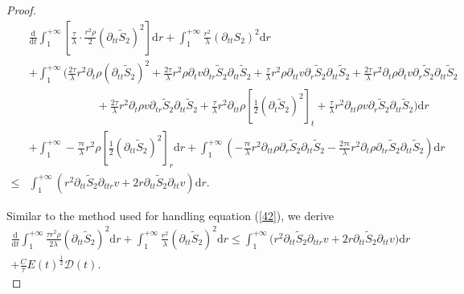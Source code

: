 \documentclass[10pt,reqno]{amsart}
\numberwithin{equation}{section}
\begin{document}
\begin{proof}
			\begin{align}\label{43}
				&\frac{\mathrm{d}}{\mathrm{d} t}\int_{1}^{+\infty}\left[\frac{\tau }{\lambda} \cdot \frac{r^2 \rho}{2}(\partial_{tt} \tilde{S}_2)^2\right]\mathrm{d}r
				+\int_{1}^{+\infty}\frac{r^2}{\lambda}(\partial_{tt}{S_2})^2\mathrm{d}r \nonumber \\
				&+\int_{1}^{+\infty}\bigg(\frac{2\tau }{\lambda}r^2\partial_{t}\rho(\partial_{tt} \tilde{S}_2)^2
				+\frac{2\tau }{\lambda}r^2\rho\partial_{t}v\partial_{tr} \tilde{S}_2\partial_{tt} \tilde{S}_2
				+\frac{\tau }{\lambda}r^2\rho\partial_{tt}v\partial_{r} \tilde{S}_2\partial_{tt} \tilde{S}_2
				+\frac{2\tau }{\lambda}r^2\partial_{t}\rho\partial_{t}v\partial_{r} \tilde{S}_2\partial_{tt} \tilde{S}_2\nonumber \\
				&\qquad\qquad\qquad
				+\frac{2\tau}{\lambda}r^2\partial_{t}\rho v \partial_{tr} \tilde{S}_2\partial_{tt} \tilde{S}_2
				+\frac{\tau}{\lambda}r^2\partial_{tt}\rho[\frac{1}{2}(\partial_{t} \tilde{S}_2)^2]_t
				+\frac{\tau}{\lambda}r^2\partial_{tt}\rho v\partial_{r} \tilde{S}_2\partial_{tt} \tilde{S}_2\bigg)\mathrm{d}r\nonumber \\
				&+\int_{1}^{+\infty}
				-\frac{\tau \epsilon}{\lambda}r^2\rho [\frac{1}{2}(\partial_{tt}\tilde{S}_2)^2]_r\mathrm{d}r
				+\int_{1}^{+\infty}\left(-\frac{\tau \epsilon}{\lambda}r^2\partial_{tt}\rho \partial_{r}\tilde{S}_2\partial_{tt} \tilde{S}_2
				-\frac{2\tau\epsilon}{\lambda}r^2\partial_{t}\rho\partial_{tr}\tilde{S}_2\partial_{tt}\tilde{S}_2\right)\mathrm{d}r \nonumber \\
				\leq&\int_{1}^{+\infty}\left(r^2\partial_{tt} \tilde{S}_2\partial_{ttr}v
				+2r\partial_{tt} \tilde{S}_2\partial_{tt}v\right)\mathrm{d}r.
			\end{align}
	
		Similar to the method used for handling equation (\ref{42}), we derive
		\begin{equation}\label{43a}
			\begin{aligned}
			\frac{\mathrm{d}}{\mathrm{d} t}\int_{1}^{+\infty}\frac{\tau r^2 \rho}{2\lambda}(\partial_{tt} \tilde{S}_2)^2\mathrm{d}r
			+\int_{1}^{+\infty}\frac{r^2}{\lambda}(\partial_{tt}\tilde{S}_2)^2\mathrm{d}r
			\leq \int_{1}^{+\infty}\bigg(r^2\partial_{tt} \tilde{S}_2\partial_{ttr}v
			+2r\partial_{tt} \tilde{S}_2\partial_{tt}v\bigg)\mathrm{d}r\\
			+\frac{C}{\tau }E(t)^{\frac{1}{2}} \mathcal{D}(t).
			\end{aligned}
		\end{equation}
		

\end{proof}
\end{document}

